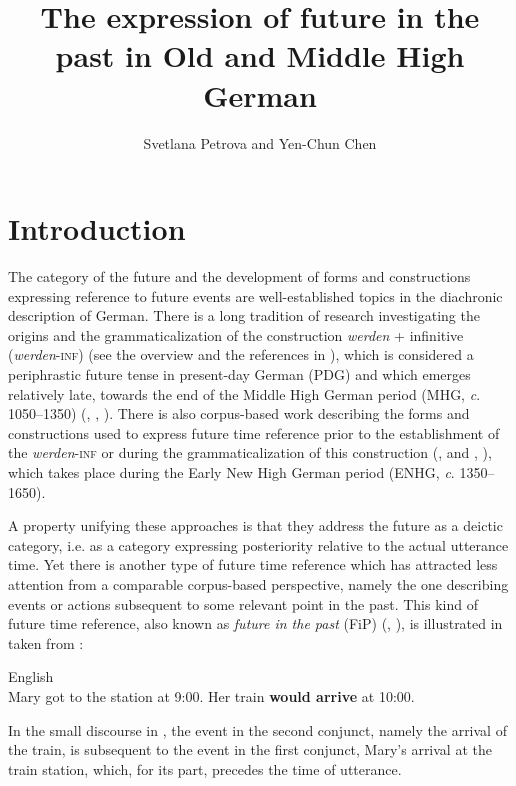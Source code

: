 \documentclass[output=paper,colorlinks,citecolor=brown]{langscibook}
\author{Svetlana Petrova\orcid{}\affiliation{University of Wuppertal} and
        Yen-Chun Chen\orcid{}\affiliation{University of Wuppertal} 
        }
\title{The expression of future in the past in Old and Middle High German}
\begin{document}
\maketitle


\section{Introduction} \label{section 1}

\sloppy
The category of the future and the development of forms and constructions expressing reference to future events are well-established topics in the diachronic description of German. There is a long tradition of research investigating the origins and the grammaticalization of the construction \textit{werden} + infinitive (\textit{werden}-\textsc{inf}) (see the overview and the references in \cite[19–45]{Luther2013}), which is considered a periphrastic future tense in present-day German (PDG) and which emerges relatively late, towards the end of the Middle High German period (MHG, \textit{c}. 1050--1350) (\cite[261]{Behaghel1924}, \cite[296]{Paul2007}, \cite[11]{Luther2012}). There is also corpus-based work describing the forms and constructions used to express future time reference prior to the establishment of the \textit{werden}-\textsc{inf} or during the grammaticalization of this construction (\cite{Schmid2000}, \cite{Luther2012} and \citeyear{Luther2013}, \cite{Hartmann2021}), which takes place during the Early New High German period (ENHG, \textit{c}. 1350–1650).

A property unifying these approaches is that they address the future as a deictic category, i.e. as a category expressing posteriority relative to the actual utterance time. Yet there is another type of future time reference which has attracted less attention from a comparable corpus-based perspective, namely the one describing events or actions subsequent to some relevant point in the past. This kind of future time reference, also known as \textit{future in the past} (FiP) (\cite[see][75 and 128]{Comrie1985}, \cite[797]{Dahl2000}), is illustrated in  taken from \citet[595]{KampReyle1993}: 

\ea \label{ex:petrova_chen:english} English \\ Mary got to the station at 9:00. Her train \textbf{would arrive} at 10:00.\\
\z
{}

In the small discourse in , the event in the second conjunct, namely the arrival of the train, is subsequent to the event in the first conjunct, Mary’s arrival at the train station, which, for its part, precedes the time of utterance.
\end{document}
